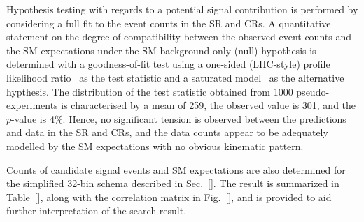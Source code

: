 Hypothesis testing with regards to a potential signal contribution is
performed by considering a full fit to the event counts in the SR and
CRs. A quantitative statement on the degree of compatibility between
the observed event counts and the SM expectations under the
SM-background-only (null) hypothesis is determined with a
goodness-of-fit test using a one-sided (LHC-style) profile likelihood
ratio~\cite{CMS-NOTE-2011-005} as the test statistic and a saturated
model~\cite{sat-llk} as the alternative hypthesis. The distribution of
the test statistic obtained from 1000 pseudo-experiments is
characterised by a mean of 259, the observed value is 301, and the
$p$-value is 4\%. Hence, no significant tension is observed between
the predictions and data in the SR and CRs, and the data counts appear
to be adequately modelled by the SM expectations with no obvious
kinematic pattern.

Counts of candidate signal events and SM expectations are also
determined for the simplified 32-bin schema described in
Sec.~\ref{}. The result is summarized in Table~\ref{}, along with the
correlation matrix in Fig.~\ref{}, and is provided to aid
further interpretation of the search result. 

